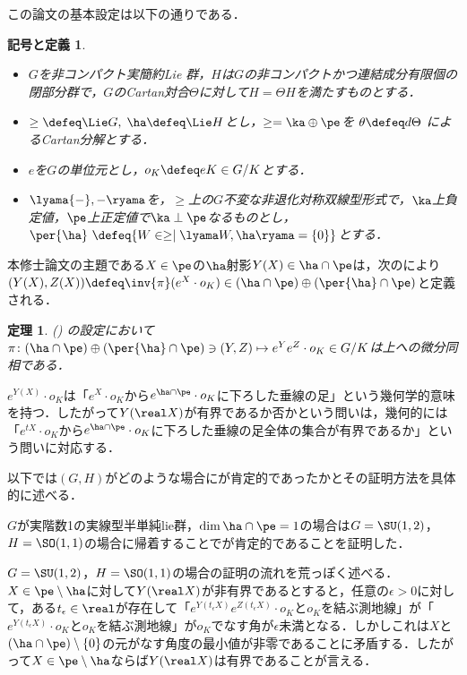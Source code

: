 \documentclass[12pt,dvipdfmx,uplatex]{jsarticle}
\newcounter{countabst}
\newtheorem{nttdef-a}[countabst]{記号と定義}
\newtheorem{thm-a}[countabst]{定理}
\begin{document}
この論文の基本設定は以下の通りである．
\begin{nttdef-a}\label{nttdef:setting}
  \leavevmode\vspace{-1em}
  \begin{itemize}
  \item $G$を非コンパクト実簡約Lie 群，$H$は$G$の非コンパクトかつ連結成分有限個の閉部分群で，$G$のCartan対合$\Theta$に対して$H = \Theta H$を満たすものとする．
  \item $\ge \defeq \Lie G,\; \ha \defeq \Lie H$とし，$\ge = \ka\oplus \pe$を $\theta \defeq d\Theta$ によるCartan分解とする．
  \item  $e$を$G$の単位元とし，$o_K \defeq eK\in G/K$とする．
  \item $\lyama{-},{-} \ryama$を，$\ge$上の$G$不変な非退化対称双線型形式で，$\ka$上負定値，$\pe$上正定値で$\ka\perp \pe$なるものとし，$\per{\ha}\ \defeq \{W\in \ge\mid \lyama W, \ha\ryama = \{0\}\} $とする．
  \end{itemize}  
\end{nttdef-a}
\vspace{-0.5em}

本修士論文の主題である$X\in \pe$の$\ha$射影$Y(X)\in \ha\cap \pe $は，次のにより${(Y(X), Z(X))\defeq \inv{\pi}(e^X\cdot o_K)\in (\ha\cap\pe)\oplus (\per{\ha}\cap \pe)}$と定義される．
\begin{thm-a}(\cite[Lemma~6.1]{kob89}\label{thm:kob89-lem6.1})
  の設定において$\pi\colon  (\ha\cap\pe)\oplus (\per{\ha}\cap \pe) \ni (Y, Z)\mapsto e^{Y}e^{Z}\cdot o_K \in G/K $は上への微分同相である．
\end{thm-a}

$e^{Y(X)}\cdot o_K$は「$e^{X}\cdot o_K$から$e^{\ha\cap\pe}\cdot o_K $に下ろした垂線の足」という幾何学的意味を持つ．したがって$Y(\real X) $が有界であるか否かという問いは，幾何的には「$e^{tX}\cdot o_K$から$e^{\ha\cap\pe}\cdot o_K $に下ろした垂線の足全体の集合が有界であるか」という問いに対応する．

以下では$(G,H) $がどのような場合にが肯定的であったかとその証明方法を具体的に述べる．

$G$が実階数1の実線型半単純lie群，$\dim \ha\cap \pe = 1$の場合は$G = \SU(1,2) $，$H= \SO(1,1)$の場合に帰着することでが肯定的であることを証明した．

$G = \SU(1,2) $，$H= \SO(1,1)$の場合の証明の流れを荒っぽく述べる．$X\in \pe\setminus\ha $に対して$Y(\real X) $が非有界であるとすると，任意の$\epsilon > 0$に対して，ある$t_{\epsilon}\in \real$が存在して「$ e^{Y(t_{\epsilon} X)}e^{Z(t_{\epsilon} X)}\cdot o_K $と$o_K$を結ぶ測地線」が「$e^{Y(t_{\epsilon} X)}\cdot o_K $と$o_K$を結ぶ測地線」が$o_K$でなす角が$\epsilon $未満となる．しかしこれは$X$と$(\ha\cap\pe)\setminus\{0\} $の元がなす角度の最小値が非零であることに矛盾する．したがって$X\in \pe\setminus\ha $ならば$Y(\real X) $は有界であることが言える．
\end{document}
